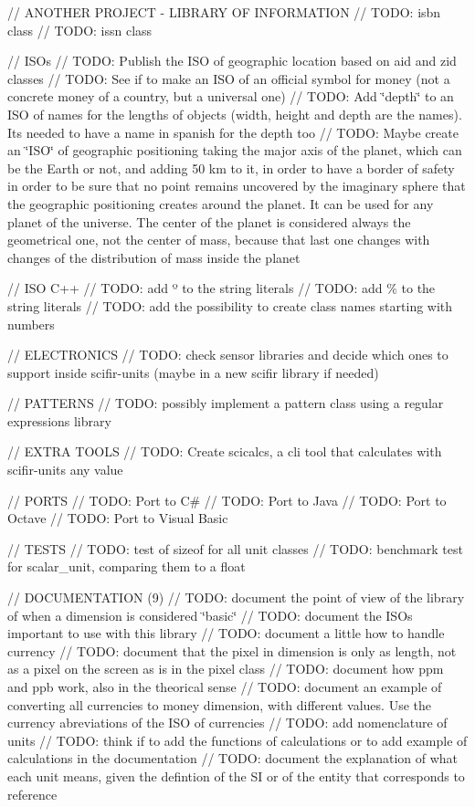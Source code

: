 // ANOTHER PROJECT -\/ LIBRARY OF INFORMATION // TODO\+: isbn class // TODO\+: issn class

// ISOs // TODO\+: Publish the ISO of geographic location based on aid and zid classes // TODO\+: See if to make an ISO of an official symbol for money (not a concrete money of a country, but a universal one) // TODO\+: Add \char`\"{}depth\char`\"{} to an ISO of names for the lengths of objects (width, height and depth are the names). It\textquotesingle{}s needed to have a name in spanish for the depth too // TODO\+: Maybe create an \char`\"{}\+ISO\char`\"{} of geographic positioning taking the major axis of the planet, which can be the Earth or not, and adding 50 km to it, in order to have a border of safety in order to be sure that no point remains uncovered by the imaginary sphere that the geographic positioning creates around the planet. It can be used for any planet of the universe. The center of the planet is considered always the geometrical one, not the center of mass, because that last one changes with changes of the distribution of mass inside the planet

// ISO C++ // TODO\+: add º to the string literals // TODO\+: add \% to the string literals // TODO\+: add the possibility to create class names starting with numbers

// ELECTRONICS // TODO\+: check sensor libraries and decide which ones to support inside scifir-\/units (maybe in a new scifir library if needed)

// PATTERNS // TODO\+: possibly implement a pattern class using a regular expressions library

// EXTRA TOOLS // TODO\+: Create scicalcs, a cli tool that calculates with scifir-\/units any value

// PORTS // TODO\+: Port to C\# // TODO\+: Port to Java // TODO\+: Port to Octave // TODO\+: Port to Visual Basic

// TESTS // TODO\+: test of sizeof for all unit classes // TODO\+: benchmark test for scalar\+\_\+unit, comparing them to a float

// DOCUMENTATION (9) // TODO\+: document the point of view of the library of when a dimension is considered \char`\"{}basic\char`\"{} // TODO\+: document the ISOs important to use with this library // TODO\+: document a little how to handle currency // TODO\+: document that the pixel in dimension is only as length, not as a pixel on the screen as is in the pixel class // TODO\+: document how ppm and ppb work, also in the theorical sense // TODO\+: document an example of converting all currencies to money dimension, with different values. Use the currency abreviations of the ISO of currencies // TODO\+: add nomenclature of units // TODO\+: think if to add the functions of calculations or to add example of calculations in the documentation // TODO\+: document the explanation of what each unit means, given the defintion of the SI or of the entity that corresponds to reference

